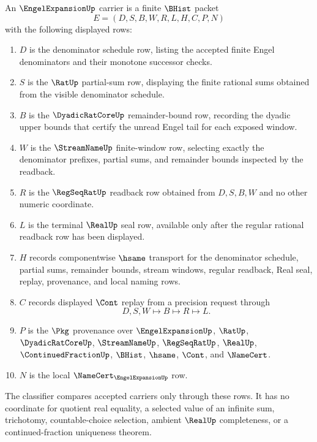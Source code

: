 \begin{definition}
\label{def:engel-expansion-carrier}
An $\EngelExpansionUp$ carrier is a finite $\BHist$ packet
$$
E=(D,S,B,W,R,L,H,C,P,N)
$$
with the following displayed rows:
\begin{enumerate}
\item $D$ is the denominator schedule row, listing the accepted finite Engel denominators and their monotone successor checks.
\item $S$ is the $\RatUp$ partial-sum row, displaying the finite rational sums obtained from the visible denominator schedule.
\item $B$ is the $\DyadicRatCoreUp$ remainder-bound row, recording the dyadic upper bounds that certify the unread Engel tail for each exposed window.
\item $W$ is the $\StreamNameUp$ finite-window row, selecting exactly the denominator prefixes, partial sums, and remainder bounds inspected by the readback.
\item $R$ is the $\RegSeqRatUp$ readback row obtained from $D,S,B,W$ and no other numeric coordinate.
\item $L$ is the terminal $\RealUp$ seal row, available only after the regular rational readback row has been displayed.
\item $H$ records componentwise $\hsame$ transport for the denominator schedule, partial sums, remainder bounds, stream windows, regular readback, Real seal, replay, provenance, and local naming rows.
\item $C$ records displayed $\Cont$ replay from a precision request through
$$
D,S,W \longmapsto B \longmapsto R \longmapsto L .
$$
\item $P$ is the $\Pkg$ provenance over $\EngelExpansionUp$, $\RatUp$, $\DyadicRatCoreUp$, $\StreamNameUp$, $\RegSeqRatUp$, $\RealUp$, $\ContinuedFractionUp$, $\BHist$, $\hsame$, $\Cont$, and $\NameCert$.
\item $N$ is the local $\NameCert_{\EngelExpansionUp}$ row.
\end{enumerate}
The classifier compares accepted carriers only through these rows. It has no coordinate for quotient real equality, a selected value of an infinite sum, trichotomy, countable-choice selection, ambient $\RealUp$ completeness, or a continued-fraction uniqueness theorem.
\end{definition}

